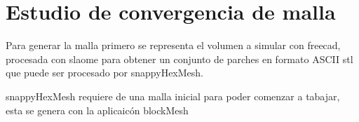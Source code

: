 \section{Estudio de convergencia de malla}
%
Para generar la malla primero se representa el volumen a simular con freecad,
procesada con slaome para obtener un conjunto de parches en formato ASCII stl
que puede ser procesado por snappyHexMesh.

snappyHexMesh requiere de una malla inicial para poder comenzar a tabajar, esta
se genera con la aplicaicón blockMesh







